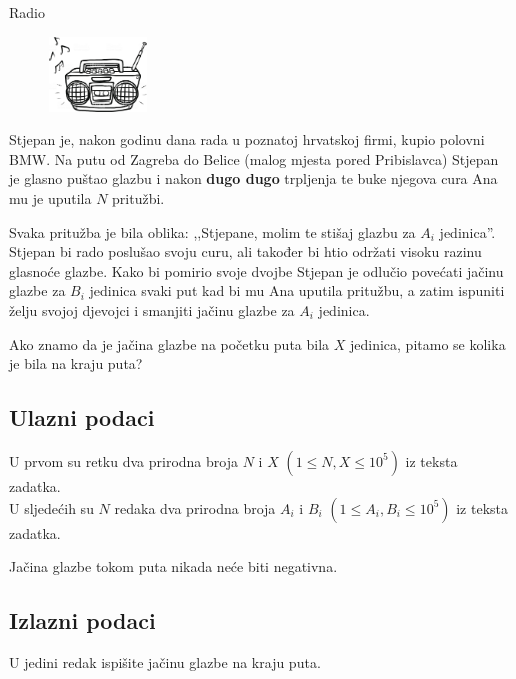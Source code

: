 \begin{statement}[
  problempoints=30,
  timelimit=1 sekunda,
  memorylimit=512 MiB,
]{Radio}

\setlength\intextsep{-0.1cm}
\begin{figure}
\centering
\includegraphics[width=0.23\textwidth]{img/radio.jpg}
\end{figure}

Stjepan je, nakon godinu dana rada u poznatoj hrvatskoj firmi, kupio polovni
BMW. Na putu od Zagreba do Belice (malog mjesta pored Pribislavca) Stjepan je
glasno puštao glazbu i nakon \textbf{dugo dugo} trpljenja te buke njegova
cura Ana mu je uputila $N$ pritužbi.

Svaka pritužba je bila oblika:
,,Stjepane, molim te stišaj glazbu za $A_i$ jedinica''.  Stjepan bi rado
poslušao svoju curu, ali također bi htio održati visoku razinu glasnoće
glazbe. Kako bi pomirio svoje dvojbe Stjepan je odlučio povećati jačinu
glazbe za $B_i$ jedinica svaki put kad bi mu Ana uputila pritužbu, a zatim
ispuniti želju svojoj djevojci i smanjiti jačinu glazbe za $A_i$ jedinica.

Ako znamo da je jačina glazbe na početku puta bila $X$ jedinica, pitamo se
kolika je bila na kraju puta?

\subsection*{Ulazni podaci}
U prvom su retku dva prirodna broja $N$ i $X$ $(1 \le N, X \le 10^5)$ iz teksta
zadatka. \\
U sljedećih su $N$ redaka dva prirodna broja $A_i$ i $B_i$ $(1 \le A_i, B_i \le 10^5)$
iz teksta zadatka.

Jačina glazbe tokom puta nikada neće biti negativna.

\subsection*{Izlazni podaci}
U jedini redak ispišite jačinu glazbe na kraju puta.


\end{statement}
